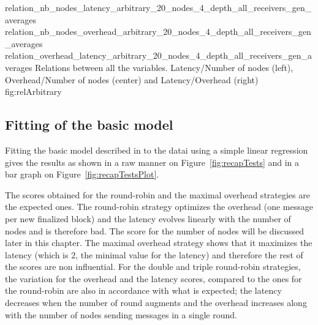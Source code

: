 \triplefigure
    {relation_nb_nodes_latency_arbitrary_20_nodes_4_depth_all_receivers_gen_averages}
    {relation_nb_nodes_overhead_arbitrary_20_nodes_4_depth_all_receivers_gen_averages}
    {relation_overhead_latency_arbitrary_20_nodes_4_depth_all_receivers_gen_averages}
    {Relations between all the variables. Latency/Number of nodes (left),
    Overhead/Number of nodes (center) and Latency/Overhead (right)}
    {fig:relArbitrary}


\subsection{Fitting of the basic model}
Fitting the basic model described in  to the datai using a simple
linear regression gives the results as shown in a raw manner on Figure~\ref{fig:recapTests} and
in a bar graph on Figure~\ref{fig:recapTestsPlot}.

\begin{table}
\end{table}

The scores obtained for the round-robin and the maximal overhead strategies are
the expected ones. The round-robin strategy optimizes the overhead (one message
per new finalized block) and the latency evolves linearly with the number of
nodes and is therefore bad. The score for the number of nodes will be discussed
later in this chapter. The maximal overhead strategy shows that it maximizes the
latency (which is \(2\), the minimal value for the latency) and therefore the
rest of the scores are non influential.
For the double and triple round-robin strategies, the variation for the overhead
and the latency scores, compared to the ones for the round-robin are also in
accordance with what is expected; the latency decreases when the number of round
augments and the overhead increases along with the number of nodes sending
messages in a single round.

